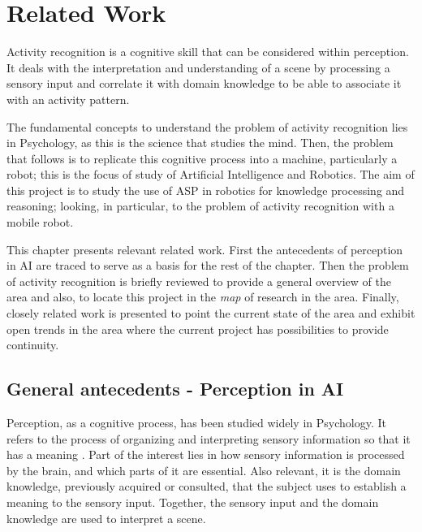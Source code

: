 \chapter{Related Work} \label{ch_relatedwork}

Activity recognition is a cognitive skill that can be considered within perception. 
It deals with the interpretation and understanding of a scene by processing a sensory input and correlate it with domain knowledge to be able to associate it with an activity pattern.

The fundamental concepts to understand the problem of activity recognition lies in Psychology, as this is the science that studies the mind. 
Then, the problem that follows is to replicate this cognitive process into a machine, particularly a robot; this is the focus of study of Artificial Intelligence and Robotics.
The aim of this project is to study the use of ASP in robotics for knowledge processing and reasoning; looking, in particular, to the problem of activity recognition with a mobile robot. 

This chapter presents relevant related work.
First the antecedents of perception in AI are traced to serve as a basis for the rest of the chapter.
Then the problem of activity recognition is briefly reviewed to provide a general overview of the area and also, to locate this project in the \textit{map} of research in the area.
Finally, closely related work is presented to point the current state of the area and exhibit open trends in the area where the current project has possibilities to provide continuity.




\section{General antecedents - Perception in AI} \label{ch_LitRev_Perception}

Perception, as a cognitive process, has been studied widely in Psychology.
It refers to the process of organizing and interpreting sensory information so that it has a meaning \citep{King2014Psychology}.
Part of the interest lies in how sensory information is processed by the brain, and which parts of it are essential.
Also relevant, it is the domain knowledge, previously acquired or consulted, that the subject uses to establish a meaning to the sensory input.
Together, the sensory input and the domain knowledge are used to interpret a scene.

